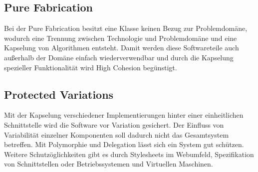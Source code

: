 \subsection{Pure Fabrication}
Bei der Pure Fabrication besitzt eine Klasse keinen Bezug zur Problemdomäne, wodurch eine Trennung zwischen Technologie und Problemdomäne und eine Kapselung von Algorithmen entsteht.
Damit werden diese Softwareteile auch außerhalb der Domäne einfach wiederverwendbar und durch die Kapselung spezieller Funktionalität wird High Cohesion begünstigt.
\subsection{Protected Variations}
Mit der Kapselung verschiedener Implementierungen hinter einer einheitlichen Schnittstelle wird die Software vor Variation gesichert.
Der Einfluss von Variabilität einzelner Komponenten soll dadurch nicht das Gesamtsystem betreffen.
Mit Polymorphie und Delegation lässt sich ein System gut schützen.
Weitere Schutzöglichkeiten gibt es durch Stylesheets im Webumfeld, Spezifikation von Schnittstellen oder Betriebssystemen und Virtuellen Maschinen.
